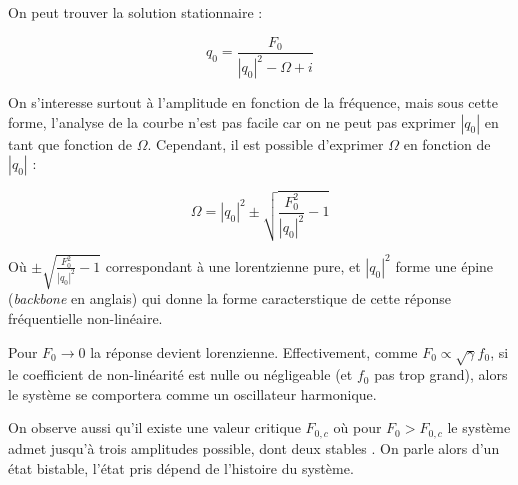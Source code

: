 On peut trouver la solution stationnaire :

\begin{equation}
    q_0 = \frac{F_0}{|q_0|^2 - \Omega + i}
    \label{eq:duff_stationnaire}
\end{equation}

On s'interesse surtout à l'amplitude en fonction de la fréquence, 
mais sous cette forme, l'analyse de la courbe n'est pas facile car 
on ne peut pas exprimer $|q_0|$ en tant que fonction de $\Omega$. 
Cependant, il est possible d'exprimer $\Omega$ en fonction de $|q_0|$ :

\begin{equation}
    \Omega = |q_0|^2 \pm \sqrt{\frac{F_0^2}{|q_0|^2} - 1 }
\end{equation}

Où $\pm \sqrt{\frac{F_0^2}{|q_0|^2} - 1 }$ correspondant à une lorentzienne pure, et $|q_0|^2$ forme 
une épine (\emph{backbone} en anglais) qui donne la forme caracterstique de cette réponse fréquentielle non-linéaire.

Pour $F_0 \to 0$ la réponse devient lorenzienne. Effectivement, comme $F_0 \propto \sqrt{\gamma} f_0$, 
si le coefficient de non-linéarité est nulle ou négligeable (et $f_0$ pas trop grand), alors le système 
se comportera comme un oscillateur harmonique.

On observe aussi qu'il existe une valeur critique $F_{0,c}$ où pour $F_0 > F_{0,c}$ le système admet 
jusqu'à trois amplitudes possible, dont deux stables \cite{landau_mechanics_1976}. On parle alors d'un état bistable, l'état pris dépend de l'histoire du système.

